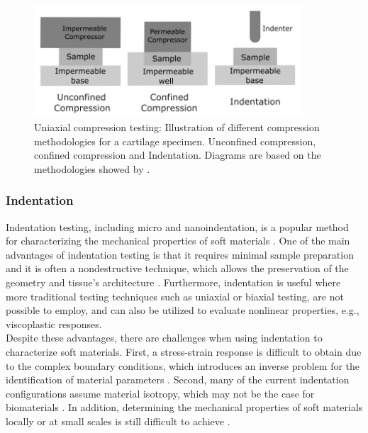 \begin{figure}%
        \centering
       \quad
       \includegraphics[width=10cm]{Images/chapter1/compressiontypes.png}%
       \caption[Uniaxial compression testing methodologies by \citet{Griffin2016}]{Uniaxial compression testing: Illustration of different compression methodologies for a cartilage specimen. Unconfined compression, confined compression and Indentation. Diagrams are based on the methodologies showed by \citet{Griffin2016}.}%
       \label{fig:compressiontypes}%
\end{figure}

\subsubsection*{Indentation}
Indentation testing, including micro and nanoindentation, is a popular method for characterizing 
the mechanical properties of soft materials \cite{Wu2016}. One of the main advantages of 
indentation testing is that it requires minimal sample preparation and it is often a 
nondestructive technique, which allows the preservation of the geometry and tissue's architecture \cite{Shi2019}.
Furthermore, indentation is useful where more traditional testing techniques such as 
uniaxial or biaxial testing, are not possible to employ, 
and can also be utilized to evaluate nonlinear properties, e.g., viscoplastic responses\cite{Bergström2015}.\\

Despite these advantages, there are challenges when using indentation to 
characterize soft materials. First, a stress-strain response is difficult to
obtain due to the complex boundary conditions, which introduces an inverse problem 
for the identification of material parameters \cite{Shi2019}. Second, many of the current 
indentation configurations assume material isotropy, which may not be the case for biomaterials \cite{Feng2017}.
In addition, determining the mechanical properties of soft materials locally or at small scales is still difficult to achieve \cite{Zhang2014}.


